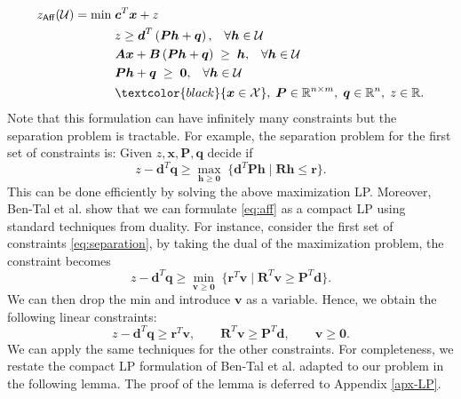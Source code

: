 \documentclass[moor]{informs1}              %
\newcommand{\mb}[1]{\ensuremath{\boldsymbol{#1}}}
\newcommand*{\red}{\textcolor{black}}
\begin{document}
 \begin{equation*}
\begin{aligned}
z_{\sf Aff}({\cal U}) = \min \; & \mb{c}^T \mb{x} + z\\
& z \geq   \mb{d}^T\left( \mb{P}\mb{h}+\mb{q}\right),  \; \; \; \forall \mb h \in {\cal U} \\
& \mb{A}\mb{x} + \mb{B}\left( \mb{P}\mb{h}+\mb{q}\right) \; \geq \; \mb{h},   \; \; \; \forall \mb h \in {\cal U} \\
& \mb{P}\mb{h}+\mb{q} \; \geq \; \mb{0},   \; \; \; \forall \mb h \in {\cal U} \\
&  \red{\mb{x}  \in  {\cal X} }, \; \mb P \in \mathbb{R}^{n \times m}, \; \mb q \in \mathbb{R}^n, \; z \in \mathbb{R}.   \\
\end{aligned}
\end{equation*}
Note that this formulation can have infinitely many constraints but the separation problem is tractable. For example, the separation problem for the first set of constraints is: Given $z, \mb x, \mb P, \mb q$ decide if
\begin{equation} \label{eq:separation}
z - \mb d^T \mb q \geq \max_{\mb h \geq \mb 0} \; \{ \mb{d}^T\mb{P}\mb{h}\; | \;  \mb R  \mb h \leq \mb r\}.
\end{equation}
This can be done efficiently by solving the above maximization LP. Moreover, Ben-Tal et al. \cite{Ben-Tal04} show that we can formulate \eqref{eq:aff} as a compact LP using standard techniques from duality. For instance, consider the first set of constraints \eqref{eq:separation}, by taking the dual of the maximization problem, the constraint becomes $$z - \mb d^T \mb q \geq \min_{\mb v \geq \mb 0} \;     \{\mb{r}^T\mb v \; | \; \mb R^T \mb v \geq \mb P^T \mb d\}.$$
We can then drop the min and introduce $\mb v $ as a variable. Hence, we obtain the following linear constraints: 
$$ z- \mb d^T \mb q \geq \mb r^T \mb v, \qquad \mb R^T \mb v \geq \mb P^T \mb d, \qquad \mb{v}  \geq \mb 0.$$ We can apply the same techniques for the other constraints.
For completeness, we restate the compact LP formulation of Ben-Tal et al. \cite{Ben-Tal04}  adapted to our problem in the following lemma. The proof of the lemma is deferred to Appendix \ref{apx-LP}.
\end{document}
